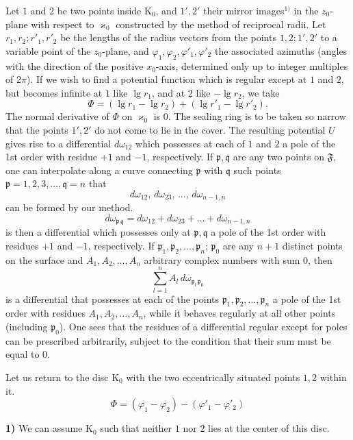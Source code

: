 \documentclass{article}
\begin{document}
Let $1$ and $2$ be two points inside $\mathrm{K}_0$, and $1', 2'$ their mirror images${}^{1)}$ in the $z_0$-plane with respect to $\varkappa_0$ constructed by the method of reciprocal radii. Let $r_1, r_2; r'_1, r'_2$ be the lengths of the radius vectors from the points $1, 2; 1', 2'$ to a variable point of the $z_0$-plane, and $\varphi_1, \varphi_2, \varphi'_1, \varphi'_2$ the associated azimuths (angles with the direction of the positive $x_0$-axis, determined only up to integer multiples of $2\pi$). If we wish to find a potential function which is regular except at $1$ and $2$, but becomes infinite at $1$ like $\lg r_1$, and at $2$ like $-\lg r_2$, we take
\[ \Phi = (\lg r_1 - \lg r_2) + (\lg r'_1 - \lg r'_2). \]
The normal derivative of $\Phi$ on $\varkappa_0$ is $0$. The sealing ring is to be taken so narrow that the points $1', 2'$ do not come to lie in the cover. The resulting potential $U$ gives rise to a differential $d\omega_{12}$ which possesses at each of $1$ and $2$ a pole of the 1st order with residue $+ 1$ and $- 1$, respectively. If $\mathfrak{p}, \mathfrak{q}$ are any two points on $\mathfrak{F}$, one can interpolate along a curve connecting $\mathfrak{p}$ with $\mathfrak{q}$ such points $\mathfrak{p} = 1, 2, 3, \dots, \mathfrak{q} = n$ that
\[ d\omega_{12}, \, d\omega_{23}, \, \dots, \, d\omega_{n-1, n} \]
can be formed by our method.
\[ d\omega_{\mathfrak{p}\,\mathfrak{q}} = d\omega_{12} + d\omega_{23} + \dots + d\omega_{n-1, n} \]
is then a differential which possesses only at $\mathfrak{p}, \mathfrak{q}$ a pole of the 1st order with residues $+ 1$ and $- 1$, respectively. If $\mathfrak{p}_1, \mathfrak{p}_2, \dots, \mathfrak{p}_n$; $\mathfrak{p}_0$ are any $n + 1$ distinct points on the surface and $A_1, A_2, \dots, A_n$ arbitrary complex numbers with sum $0$, then
\[ \sum_{l=1}^n A_l\,d\omega_{\mathfrak{p}_l\,\mathfrak{p}_0} \]
is a differential that possesses at each of the points $\mathfrak{p}_1, \mathfrak{p}_2, \dots, \mathfrak{p}_n$ a pole of the 1st order with residues $A_1, A_2, \dots, A_n$, while it behaves regularly at all other points (including $\mathfrak{p}_0$). One sees that the residues of a differential regular except for poles can be prescribed arbitrarily, subject to the condition that their sum must be equal to $0$.

Let us return to the disc $\mathrm{K}_0$ with the two eccentrically situated points $1, 2$ within it.
\[ \Phi = (\varphi_1 - \varphi_2) - (\varphi'_1 - \varphi'_2) \]

\textbf{1)} We can assume $\mathrm{K}_0$ such that neither $1$ nor $2$ lies at the center of this disc.
\end{document}
